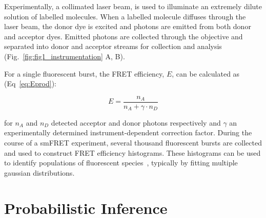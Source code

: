 Experimentally, a collimated laser beam, is used to illuminate an extremely dilute solution of labelled molecules. When a labelled molecule diffuses through the laser beam, the donor dye is excited and photons are emitted from both donor and acceptor dyes.  Emitted photons are collected through the objective and separated into donor and acceptor streams for collection and analysis (Fig.~\ref{fig:fig1_instrumentation} A, B). 

For a single fluorescent burst, the FRET efficiency, $E$, can be calculated as (Eq~\ref{eq:Eprod}):

\begin{equation}
E = \frac{n_A}{n_A + \gamma \cdot n_D}
\label{eq:Eprod}
\end{equation} 

for $n_A$ and $n_D$ detected acceptor and donor photons respectively and $\gamma$ an experimentally determined instrument-dependent correction factor. During the course of a smFRET experiment, several thousand fluorescent bursts are collected and used to construct FRET efficiency histograms. These histograms can be used to identify populations of fluorescent species~\cite{ha96}, typically by fitting multiple gaussian distributions.

\section{Probabilistic Inference}
